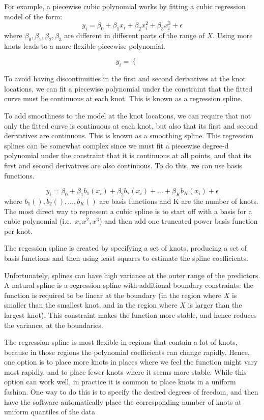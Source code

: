 \documentclass[
]{article}
\begin{document}
For example, a piecewise cubic polynomial works by fitting a cubic
regression model of the form: \[
y_i = \beta_0 + \beta_1x_i + \beta_2x_i^2 + \beta_3x_i^3 + \epsilon
\] where \(\beta_0, \beta_1, \beta_2, \beta_3\) are different in
different parts of the range of \(X\). Using more knots leads to a more
flexible piecewise polynomial.

\[
y_i = \left\{\begin{matrix}
 & \\ 
 & 
\end{matrix}\right.
\]

To avoid having discontinuities in the first and second derivatives at
the knot locations, we can fit a piecewise polynomial under the
constraint that the fitted curve must be continuous at each knot. This
is known as a regression spline.

To add smoothness to the model at the knot locations, we can require
that not only the fitted curve is continuous at each knot, but also that
its first and second derivatives are continuous. This is known as a
smoothing spline. This regression splines can be somewhat complex since
we must fit a piecewise degree-d polynomial under the constraint that it
is continuous at all points, and that its first and second derivatives
are also continuous. To do this, we can use basis functions.

\[
y_i = \beta_0 + \beta_1b_1(x_i) + \beta_2b_2(x_i) + ... + \beta_Kb_K(x_i) + \epsilon
\] where \(b_1(), b_2(), ..., b_K()\) are basis functions and K are the
number of knots. The most direct way to represent a cubic spline is to
start off with a basis for a cubic polynomial (i.e.~\(x, x^2, x^3\)) and
then add one truncated power basis function per knot.

The regession spline is created by specifying a set of knots, producing
a set of basis functions and then using least squares to estimate the
spline coefficients.

Unfortunately, splines can have high variance at the outer range of the
predictors. A natural spline is a regression spline with additional
boundary constraints: the function is required to be linear at the
boundary (in the region where \(X\) is smaller than the smallest knot,
and in the region where \(X\) is larger than the largest knot). This
constraint makes the function more stable, and hence reduces the
variance, at the boundaries.

The regression spline is most flexible in regions that contain a lot of
knots, because in those regions the polynomial coefficients can change
rapidly. Hence, one option is to place more knots in places where we
feel the function might vary most rapidly, and to place fewer knots
where it seems more stable. While this option can work well, in practice
it is common to place knots in a uniform fashion. One way to do this is
to specify the desired degrees of freedom, and then have the software
automatically place the corresponding number of knots at uniform
quantiles of the data
\end{document}
